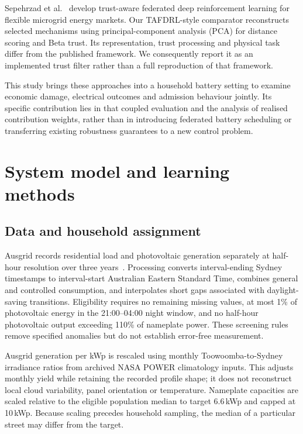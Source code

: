 \documentclass[preprint,12pt,a4paper]{elsarticle}
\begin{document}
Sepehrzad et al.~\cite{tafdrl} develop trust-aware federated deep reinforcement learning for flexible microgrid energy markets. Our TAFDRL-style comparator reconstructs selected mechanisms using principal-component analysis (PCA) for distance scoring and Beta trust. Its representation, trust processing and physical task differ from the published framework. We consequently report it as an implemented trust filter rather than a full reproduction of that framework.

This study brings these approaches into a household battery setting to examine economic damage, electrical outcomes and admission behaviour jointly. Its specific contribution lies in that coupled evaluation and the analysis of realised contribution weights, rather than in introducing federated battery scheduling or transferring existing robustness guarantees to a new control problem.



\section{System model and learning methods}
\label{sec:methods}
\subsection{Data and household assignment}
Ausgrid records residential load and photovoltaic generation separately at half-hour resolution over three years~\cite{ausgrid}. Processing converts interval-ending Sydney timestamps to interval-start Australian Eastern Standard Time, combines general and controlled consumption, and interpolates short gaps associated with daylight-saving transitions. Eligibility requires no remaining missing values, at most 1\% of photovoltaic energy in the 21:00--04:00 night window, and no half-hour photovoltaic output exceeding 110\% of nameplate power. These screening rules remove specified anomalies but do not establish error-free measurement.

Ausgrid generation per kWp is rescaled using monthly Toowoomba-to-Sydney irradiance ratios from archived NASA POWER climatology inputs. This adjusts monthly yield while retaining the recorded profile shape; it does not reconstruct local cloud variability, panel orientation or temperature. Nameplate capacities are scaled relative to the eligible population median to target 6.6\,kWp and capped at 10\,kWp. Because scaling precedes household sampling, the median of a particular street may differ from the target.
\end{document}
